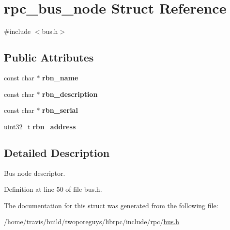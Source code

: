 \hypertarget{structrpc__bus__node}{\section{rpc\-\_\-bus\-\_\-node Struct Reference}
\label{structrpc__bus__node}
}


{\ttfamily \#include $<$bus.\-h$>$}

\subsection*{Public Attributes}
\begin{DoxyCompactItemize}
\item 
\hypertarget{structrpc__bus__node_a7fa4491eff39bb96c779b4208ca388ec}{const char $\ast$ {\bfseries rbn\-\_\-name}}\label{structrpc__bus__node_a7fa4491eff39bb96c779b4208ca388ec}

\item 
\hypertarget{structrpc__bus__node_aa7eab44be63bee011e2b7589a092a3ab}{const char $\ast$ {\bfseries rbn\-\_\-description}}\label{structrpc__bus__node_aa7eab44be63bee011e2b7589a092a3ab}

\item 
\hypertarget{structrpc__bus__node_a9f5b9214a64d9cd54cd4839f869ba7df}{const char $\ast$ {\bfseries rbn\-\_\-serial}}\label{structrpc__bus__node_a9f5b9214a64d9cd54cd4839f869ba7df}

\item 
\hypertarget{structrpc__bus__node_a624e2a0be665938924ab2f815afb669e}{uint32\-\_\-t {\bfseries rbn\-\_\-address}}\label{structrpc__bus__node_a624e2a0be665938924ab2f815afb669e}

\end{DoxyCompactItemize}


\subsection{Detailed Description}
Bus node descriptor. 

Definition at line 50 of file bus.\-h.



The documentation for this struct was generated from the following file\-:\begin{DoxyCompactItemize}
\item 
/home/travis/build/twoporeguys/librpc/include/rpc/\hyperlink{bus_8h}{bus.\-h}\end{DoxyCompactItemize}
